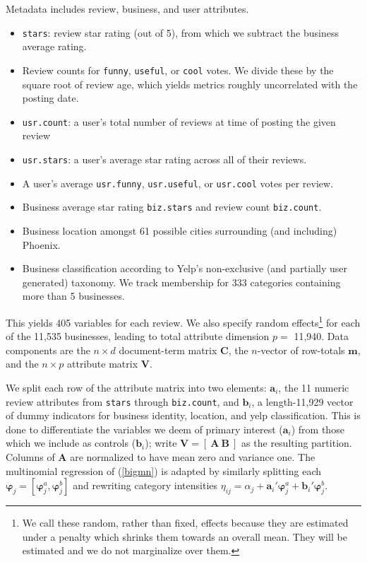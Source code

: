\documentclass[12pt]{article}
\newcommand{\sgl}{\setstretch{1.1}}
\newcommand{\bs}[1]{\boldsymbol{#1}}
\newcommand{\bm}[1]{\mathbf{#1}}
\newcommand{\cd}[1]{{\tt#1}}
\begin{document}
\noindent Metadata
includes review, business, and user attributes.
\begin{itemize}\sgl
\item \cd{stars}: review star rating (out of 5), from which we subtract the business average rating.
\item Review counts for \cd{funny}, \cd{useful}, or \cd{cool} votes.  We divide these by the square root of review age, which yields metrics roughly uncorrelated with the posting date.
\item \cd{usr.count}: a user's total number of reviews at time of posting the given review
\item \cd{usr.stars}: a user's average star rating across all of their reviews.
\item A user's average \cd{usr.funny}, \cd{usr.useful}, or \cd{usr.cool} votes
per review.
\item Business average star rating \cd{biz.stars} and review count \cd{biz.count}.
\item Business location amongst 61 possible cities surrounding (and including) Phoenix.
\item Business classification according to Yelp's non-exclusive (and partially user generated) taxonomy.  We track membership  for 
333 categories  containing more than 5 businesses. 
\end{itemize}
This yields 405 variables for each review.  We also specify random
effects\footnote{We call these random, rather than fixed, effects because they
are estimated under a penalty which shrinks them towards an overall mean.  They will be estimated and we do not marginalize over them.  } for each of the 11,535  businesses, leading to total attribute
dimension $p=$ 11,940. Data components are the $n \times d$ document-term
matrix $\bm{C}$, the $n$-vector of row-totals  $\bm{m}$, and the $n\times
p$ attribute matrix $\bm{V}$.

We split each row of the attribute matrix into two elements: $\bm{a}_i$, the
11 numeric review attributes from \cd{stars} through
 \cd{biz.count}, and $\bm{b}_i$, a length-11,929 vector of dummy indicators for  business identity,
 location, and yelp classification.    This is done to differentiate the
 variables we deem of primary interest ($\bm{a}_i$) from those which we
 include as controls ($\bm{b}_i$); write $\bm{V} = [~\bm{A}~ \bm{B}~]$ as the
 resulting partition. Columns of $\bm{A}$ are normalized to have mean zero and
 variance one.  The multinomial regression  of (\ref{bigmn}) is adapted by
 similarly splitting each $\bs{\varphi}_j = [ {\bs{\varphi}_j^a},
 {\bs{\varphi}_j^b}]$ and rewriting category intensities
$
\eta_{ij} = \alpha_j + \bm{a}_i'\bs{\varphi}^a_j + \bm{b}_i'\bs{\varphi}^b_j.
$
\end{document}
